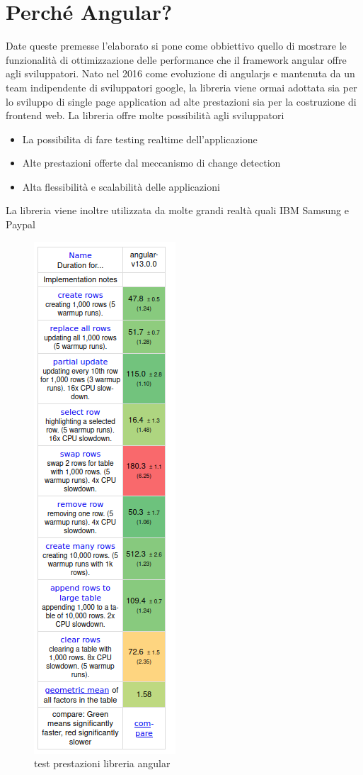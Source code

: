 \section{Perché Angular?}
Date queste premesse l'elaborato si pone come obbiettivo quello di mostrare le funzionalità di ottimizzazione delle performance che il framework angular offre agli sviluppatori.
\newline
Nato nel 2016 come evoluzione di angularjs e mantenuta da un team indipendente di sviluppatori google, la libreria viene ormai adottata sia per lo sviluppo di single page application ad alte prestazioni sia per la costruzione di frontend web.
\newline
La libreria offre molte possibilità agli sviluppatori
\begin{itemize}
    \item La possibilita di fare testing realtime dell'applicazione
    \item Alte prestazioni offerte dal meccanismo di change detection
    \item Alta flessibilità e scalabilità delle applicazioni
\end{itemize}
La libreria viene inoltre utilizzata da molte grandi realtà quali IBM Samsung e Paypal
\newline
\begin{figure}[H]
   \centering
   \includegraphics[scale=0.4]{resources/angular-performance.png}
\caption{test prestazioni libreria angular}
\end{figure}
